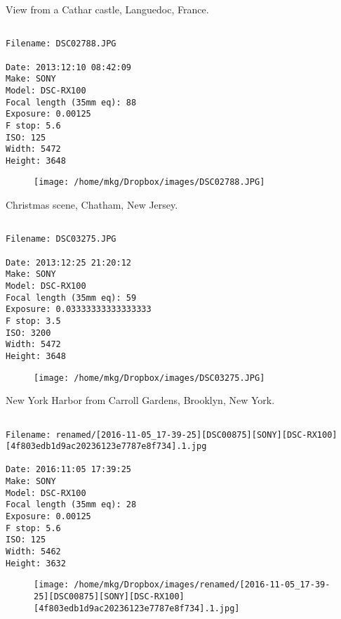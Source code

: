 \clearpage
\onecolumn
\noindent View from a Cathar castle, Languedoc, France.
\noindent
\begin{lstlisting}

Filename: DSC02788.JPG

Date: 2013:12:10 08:42:09
Make: SONY
Model: DSC-RX100
Focal length (35mm eq): 88
Exposure: 0.00125
F stop: 5.6
ISO: 125
Width: 5472
Height: 3648
\end{lstlisting}
\clearpage

\begin{figure}
\texttt{[image: /home/mkg/Dropbox/images/DSC02788.JPG]}
\end{figure}
    
\clearpage
\onecolumn
\noindent Christmas scene, Chatham, New Jersey.
\noindent
\begin{lstlisting}

Filename: DSC03275.JPG

Date: 2013:12:25 21:20:12
Make: SONY
Model: DSC-RX100
Focal length (35mm eq): 59
Exposure: 0.03333333333333333
F stop: 3.5
ISO: 3200
Width: 5472
Height: 3648
\end{lstlisting}
\clearpage

\begin{figure}
\texttt{[image: /home/mkg/Dropbox/images/DSC03275.JPG]}
\end{figure}
    
\clearpage
\onecolumn
\noindent New York Harbor from Carroll Gardens, Brooklyn, New York.
\noindent
\begin{lstlisting}

Filename: renamed/[2016-11-05_17-39-25][DSC00875][SONY][DSC-RX100][4f803edb1d9ac20236123e7787e8f734].1.jpg

Date: 2016:11:05 17:39:25
Make: SONY
Model: DSC-RX100
Focal length (35mm eq): 28
Exposure: 0.00125
F stop: 5.6
ISO: 125
Width: 5462
Height: 3632
\end{lstlisting}
\clearpage

\begin{figure}
\texttt{[image: /home/mkg/Dropbox/images/renamed/[2016-11-05\_17-39-25][DSC00875][SONY][DSC-RX100][4f803edb1d9ac20236123e7787e8f734].1.jpg]}
\end{figure}
    
